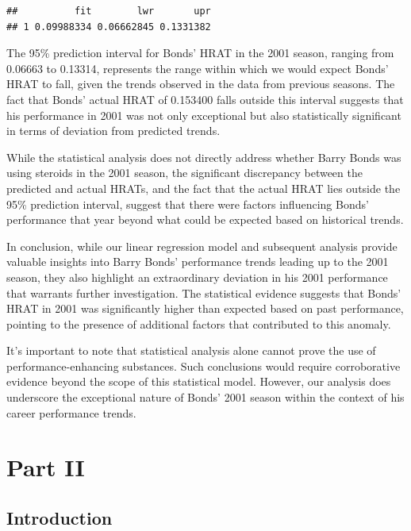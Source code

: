 \documentclass[
]{article}
\begin{document}
\begin{verbatim}
##          fit        lwr       upr
## 1 0.09988334 0.06662845 0.1331382
\end{verbatim}

The 95\% prediction interval for Bonds' HRAT in the 2001 season, ranging
from 0.06663 to 0.13314, represents the range within which we would
expect Bonds' HRAT to fall, given the trends observed in the data from
previous seasons. The fact that Bonds' actual HRAT of 0.153400 falls
outside this interval suggests that his performance in 2001 was not only
exceptional but also statistically significant in terms of deviation
from predicted trends.

While the statistical analysis does not directly address whether Barry
Bonds was using steroids in the 2001 season, the significant discrepancy
between the predicted and actual HRATs, and the fact that the actual
HRAT lies outside the 95\% prediction interval, suggest that there were
factors influencing Bonds' performance that year beyond what could be
expected based on historical trends.

In conclusion, while our linear regression model and subsequent analysis
provide valuable insights into Barry Bonds' performance trends leading
up to the 2001 season, they also highlight an extraordinary deviation in
his 2001 performance that warrants further investigation. The
statistical evidence suggests that Bonds' HRAT in 2001 was significantly
higher than expected based on past performance, pointing to the presence
of additional factors that contributed to this anomaly.

It's important to note that statistical analysis alone cannot prove the
use of performance-enhancing substances. Such conclusions would require
corroborative evidence beyond the scope of this statistical model.
However, our analysis does underscore the exceptional nature of Bonds'
2001 season within the context of his career performance trends.

\newpage

\hypertarget{part-ii}{%
\section{Part II}\label{part-ii}}

\hypertarget{introduction}{%
\subsection{Introduction}\label{introduction}}
\end{document}
